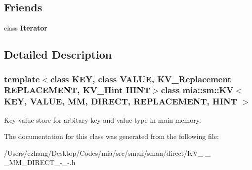 \subsection*{Friends}
\begin{DoxyCompactItemize}
\item 
\hypertarget{classmia_1_1sm_1_1_k_v_3_01_k_e_y_00_01_v_a_l_u_e_00_01_m_m_00_01_d_i_r_e_c_t_00_01_r_e_p_l_a_c_e_m_e_n_t_00_01_h_i_n_t_01_4_a9830fc407400559db7e7783cc10a9394}{class {\bfseries Iterator}}\label{classmia_1_1sm_1_1_k_v_3_01_k_e_y_00_01_v_a_l_u_e_00_01_m_m_00_01_d_i_r_e_c_t_00_01_r_e_p_l_a_c_e_m_e_n_t_00_01_h_i_n_t_01_4_a9830fc407400559db7e7783cc10a9394}

\end{DoxyCompactItemize}


\subsection{Detailed Description}
\subsubsection*{template$<$class K\-E\-Y, class V\-A\-L\-U\-E, K\-V\-\_\-\-Replacement R\-E\-P\-L\-A\-C\-E\-M\-E\-N\-T, K\-V\-\_\-\-Hint H\-I\-N\-T$>$class mia\-::sm\-::\-K\-V$<$ K\-E\-Y, V\-A\-L\-U\-E, M\-M, D\-I\-R\-E\-C\-T, R\-E\-P\-L\-A\-C\-E\-M\-E\-N\-T, H\-I\-N\-T $>$}

Key-\/value store for arbitary key and value type in main memory. 

The documentation for this class was generated from the following file\-:\begin{DoxyCompactItemize}
\item 
/\-Users/czhang/\-Desktop/\-Codes/mia/src/sman/sman/direct/K\-V\-\_\--\/\-\_\--\/\-\_\-\-M\-M\-\_\-\-D\-I\-R\-E\-C\-T\-\_\--\/\-\_\--\/.\-h\end{DoxyCompactItemize}
